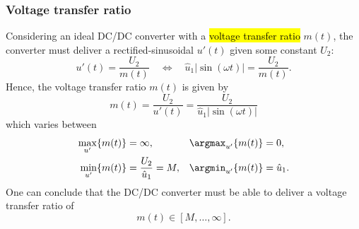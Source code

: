 \begin{frame}
    \frametitle{Voltage transfer ratio} 
    Considering an ideal DC/DC converter with a \hl{voltage transfer ratio} $m(t)$, the converter must deliver a rectified-sinusoidal $u'(t)$ given some constant $U_2$:
    \begin{equation}
        u'(t) = \frac{U_2}{m(t)} \quad \Leftrightarrow \quad \hat{u}_1|\sin(\omega t)| = \frac{U_2}{m(t)}.
    \end{equation}\pause
    Hence, the voltage transfer ratio $m(t)$ is given by
    \begin{equation}
        m(t) = \frac{U_2}{u'(t)}=\frac{U_2}{\hat{u}_1|\sin(\omega t)|} 
    \end{equation}\pause
    which varies between
    \begin{equation}
        \begin{alignedat}{2}
            \max_{u'}\{m(t)\} &= \infty, \quad &&\argmax_{u'}\{m(t)\} = 0,\\
            \min_{u'}\{m(t)\} &= \frac{U_2}{\hat{u}_1}=M, \quad &&\argmin_{u'}\{m(t)\} = \hat{u}_1.
        \end{alignedat}
    \end{equation}\pause
    One can conclude that the DC/DC converter must be able to deliver a voltage transfer ratio of 
    $$
     m(t)\in[M,\ldots,\infty].
    $$
\end{frame}

